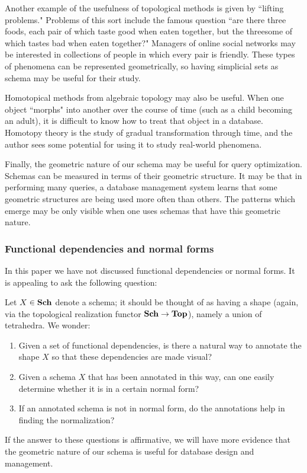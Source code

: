 \documentclass{amsart}
\begin{document}
Another example of the usefulness of topological methods is given by ``lifting problems."  Problems of this sort include the famous question ``are there three foods, each pair of which taste good when eaten together, but the threesome of which tastes bad when eaten together?"  Managers of online social networks may be interested in collections of people in which every pair is friendly.  These types of phenomena can be represented geometrically, so having simplicial sets as schema may be useful for their study.

Homotopical methods from algebraic topology may also be useful.  When one object ``morphs" into another over the course of time (such as a child becoming an adult), it is difficult to know how to treat that object in a database.  Homotopy theory is the study of gradual transformation through time, and the author sees some potential for using it to study real-world phenomena.

Finally, the geometric nature of our schema may be useful for query optimization.  Schemas can be measured in terms of their geometric structure.  It may be that in performing many queries, a database management system learns that some geometric structures are being used more often than others.  The patterns which emerge may be only visible when one uses schemas that have this geometric nature.

\subsubsection{Functional dependencies and normal forms}

In this paper we have not discussed functional dependencies or normal forms.  It is appealing to ask the following question:

\begin{question}

Let $X\in{\bf Sch}$ denote a schema; it should be thought of as having a shape (again, via the topological realization functor ${\bf Sch}\rightarrow{\bf Top}$), namely a union of tetrahedra.  We wonder:

\begin{enumerate}\item Given a set of functional dependencies, is there a natural way to annotate the shape $X$ so that these dependencies are made visual? \item Given a schema $X$ that has been annotated in this way, can one easily determine whether it is in a certain normal form?  \item If an annotated schema is not in normal form, do the annotations help in finding the normalization? \end{enumerate}  If the answer to these questions is affirmative, we will have more evidence that the geometric nature of our schema is useful for database design and management.

\end{question}
\end{document}
